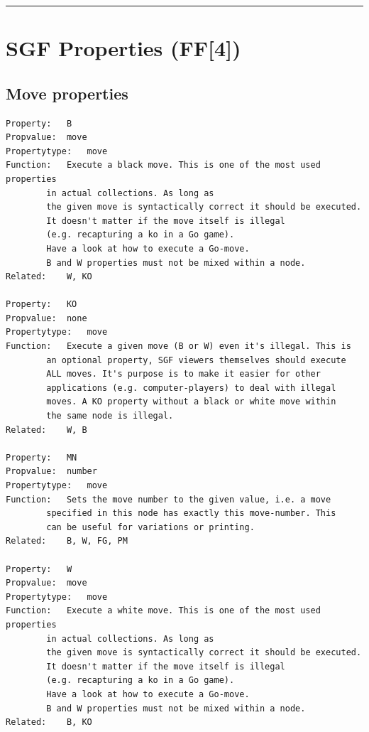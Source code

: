 \begin{center}\rule{0.5\linewidth}{0.5pt}\end{center}

\section{SGF Properties (FF{[}4{]})}\label{sgf-properties-ff4}

\subsection{Move properties}\label{move-properties}

\begin{verbatim}
Property:   B
Propvalue:  move
Propertytype:   move
Function:   Execute a black move. This is one of the most used properties
        in actual collections. As long as
        the given move is syntactically correct it should be executed.
        It doesn't matter if the move itself is illegal
        (e.g. recapturing a ko in a Go game).
        Have a look at how to execute a Go-move.
        B and W properties must not be mixed within a node.
Related:    W, KO

Property:   KO
Propvalue:  none
Propertytype:   move
Function:   Execute a given move (B or W) even it's illegal. This is
        an optional property, SGF viewers themselves should execute
        ALL moves. It's purpose is to make it easier for other
        applications (e.g. computer-players) to deal with illegal
        moves. A KO property without a black or white move within
        the same node is illegal.
Related:    W, B

Property:   MN
Propvalue:  number
Propertytype:   move
Function:   Sets the move number to the given value, i.e. a move
        specified in this node has exactly this move-number. This
        can be useful for variations or printing.
Related:    B, W, FG, PM

Property:   W
Propvalue:  move
Propertytype:   move
Function:   Execute a white move. This is one of the most used properties
        in actual collections. As long as
        the given move is syntactically correct it should be executed.
        It doesn't matter if the move itself is illegal
        (e.g. recapturing a ko in a Go game).
        Have a look at how to execute a Go-move.
        B and W properties must not be mixed within a node.
Related:    B, KO
\end{verbatim}


